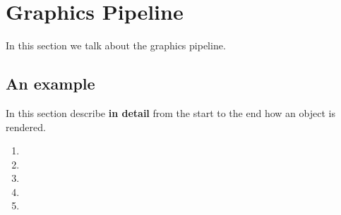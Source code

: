 
\section{Graphics Pipeline}

In this section we talk about the graphics pipeline.

\subsection{An example}

In this section describe {\bf in detail} from the start to the end how an object is rendered.

\begin{enumerate}
	\item{}
	\item{}
	\item{}
	\item{}
	\item{}
\end{enumerate}
